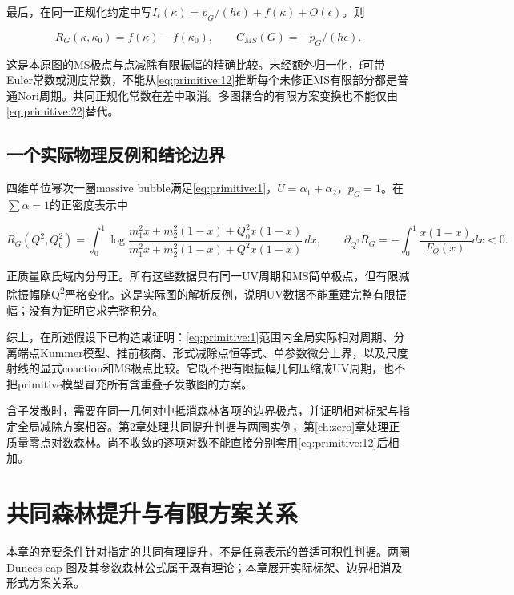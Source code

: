 \documentclass[11pt,a4paper,oneside]{ctexrep}
\theoremstyle{cnplain}
\theoremstyle{definition}
\theoremstyle{remark}
\begin{document}
最后，在同一正规化约定中写\(I_\epsilon (\kappa )=p_G/(h\epsilon )+f(\kappa )+O(\epsilon )\)。则

\begin{equation}
R_G(\kappa,\kappa_0)=f(\kappa)-f(\kappa_0),\qquad
                 C_{MS}(G)=-p_G/(h\epsilon).                    \label{eq:primitive:22}
\end{equation}

这是本原图的MS极点与点减除有限振幅的精确比较。未经额外归一化，f可带Euler常数或测度常数，不能从\eqref{eq:primitive:12}推断每个未修正MS有限部分都是普通Nori周期。共同正规化常数在差中取消。多图耦合的有限方案变换也不能仅由\eqref{eq:primitive:22}替代。

\section{一个实际物理反例和结论边界}\label{sec:primitive:9}

四维单位幂次一圈massive bubble满足\eqref{eq:primitive:1}，\(U=\alpha _1+\alpha _2\)，\(p_G=1\)。在\(\sum \alpha =1\)的正密度表示中

\begin{equation}
R_G(Q^2,Q_0^2)=\int_0^1
 \log\frac{m_1^2x+m_2^2(1-x)+Q_0^2x(1-x)}
          {m_1^2x+m_2^2(1-x)+Q^2x(1-x)}\,dx,\qquad
 \partial_{Q^2}R_G=-\int_0^1\frac{x(1-x)}{F_Q(x)}dx<0.            \label{eq:primitive:23}
\end{equation}

正质量欧氏域内分母正。所有这些数据具有同一UV周期和MS简单极点，但有限减除振幅随Q\textsuperscript{2}严格变化。这是实际图的解析反例，说明UV数据不能重建完整有限振幅；没有为证明它求完整积分。

综上，在所述假设下已构造或证明：\eqref{eq:primitive:1}范围内全局实际相对周期、分离端点Kummer模型、推前核商、形式减除点恒等式、单参数微分上界，以及尺度射线的显式coaction和MS极点比较。它既不把有限振幅几何压缩成UV周期，也不把primitive模型冒充所有含重叠子发散图的方案。

含子发散时，需要在同一几何对中抵消森林各项的边界极点，并证明相对标架与指定全局减除方案相容。第\ref{ch:forest}章处理共同提升判据与两圈实例，第\ref{ch:zero}章处理正质量零点对数森林。尚不收敛的逐项对数不能直接分别套用\eqref{eq:primitive:12}后相加。


\chapter{共同森林提升与有限方案关系}\label{ch:forest}
本章的充要条件针对指定的共同有理提升，不是任意表示的普适可积性判据。两圈 Dunce\textquotesingle s cap 图及其参数森林公式属于既有理论\cite{bk2012}；本章展开实际标架、边界相消及形式方案关系。
\end{document}

